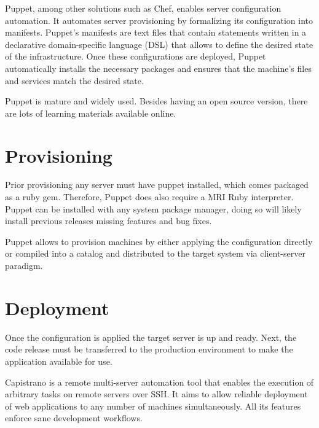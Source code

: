 Puppet, among other solutions such as Chef, enables server configuration automation. It automates server provisioning by formalizing its configuration into manifests. Puppet's manifests are text files that contain statements written in a declarative domain-specific language (DSL) that allows to define the desired state of the infrastructure. Once these configurations are deployed, Puppet automatically installs the necessary packages and ensures that the machine’s files and services match the desired state.


Puppet is mature and widely used. Besides having an open source version, there are lots of learning materials available online.

\section{Provisioning}

Prior provisioning any server must have puppet installed, which comes packaged as a ruby gem. Therefore, Puppet does also require a MRI Ruby interpreter. Puppet can be installed with any system package manager, doing so will likely install previous releases missing features and bug fixes.

Puppet allows to provision machines by either applying the configuration directly or compiled into a catalog and distributed to the target system via client-server paradigm.

\section{Deployment}

Once the configuration is applied the target server is up and ready. Next, the code release must be transferred to the production environment to make the application available for use.

Capistrano is a remote multi-server automation tool that enables the execution of arbitrary tasks on remote servers over SSH. It aims to allow reliable deployment of web applications to any number of machines simultaneously. All its features enforce sane development workflows.

